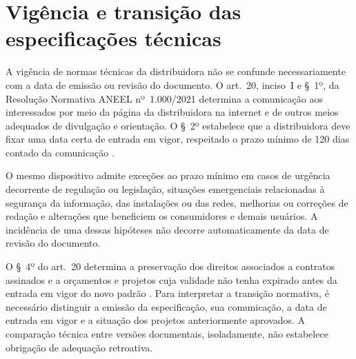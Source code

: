 \section{Vigência e transição das especificações técnicas}
\label{sec:transicao}

A vigência de normas técnicas da distribuidora não se confunde necessariamente com a data de emissão ou revisão do documento. O art.~20, inciso~I e §~1º, da Resolução Normativa ANEEL nº~1.000/2021 determina a comunicação aos interessados por meio da página da distribuidora na internet e de outros meios adequados de divulgação e orientação. O §~2º estabelece que a distribuidora deve fixar uma data certa de entrada em vigor, respeitado o prazo mínimo de 120 dias contado da comunicação \cite[art.~20]{aneel1000}.

O mesmo dispositivo admite exceções ao prazo mínimo em casos de urgência decorrente de regulação ou legislação, situações emergenciais relacionadas à segurança da informação, das instalações ou das redes, melhorias ou correções de redação e alterações que beneficiem os consumidores e demais usuários. A incidência de uma dessas hipóteses não decorre automaticamente da data de revisão do documento.

O §~4º do art.~20 determina a preservação dos direitos associados a contratos assinados e a orçamentos e projetos cuja validade não tenha expirado antes da entrada em vigor do novo padrão \cite[art.~20, §~4º]{aneel1000}. Para interpretar a transição normativa, é necessário distinguir a emissão da especificação, sua comunicação, a data de entrada em vigor e a situação dos projetos anteriormente aprovados. A comparação técnica entre versões documentais, isoladamente, não estabelece obrigação de adequação retroativa.
